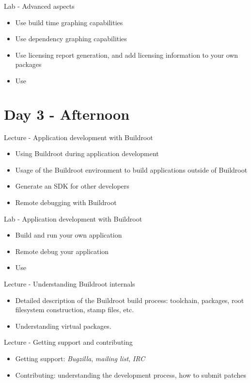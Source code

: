 \documentclass[a4paper,12pt,obeyspaces,spaces,hyphens]{article}
\begin{document}
\feagendaonecolumn
{Lab - Advanced aspects}
{
  \begin{itemize}
  \item Use build time graphing capabilities
  \item Use dependency graphing capabilities
  \item Use licensing report generation, and add licensing
    information to your own packages
  \item Use 
  \end{itemize}
}

\section{Day 3 - Afternoon}

\feagendatwocolumn
{Lecture - Application development with Buildroot}
{
  \begin{itemize}
  \item Using Buildroot during application development
  \item Usage of the Buildroot environment to build applications
    outside of Buildroot
  \item Generate an SDK for other developers
  \item Remote debugging with Buildroot
  \end{itemize}
}
{Lab - Application development with Buildroot}
{
  \begin{itemize}
  \item Build and run your own application
  \item Remote debug your application
  \item Use 
  \end{itemize}
}

\feagendatwocolumn
{Lecture - Understanding Buildroot internals}
{
  \begin{itemize}
  \item Detailed description of the Buildroot build process:
    toolchain, packages, root filesystem construction, stamp files,
    etc.
  \item Understanding virtual packages.
  \end{itemize}
}
{Lecture - Getting support and contributing}
{
  \begin{itemize}
  \item Getting support: {\em Bugzilla}, {\em mailing list}, {\em IRC}
  \item Contributing: understanding the development process, how to
    submit patches
  \end{itemize}
}
\end{document}
